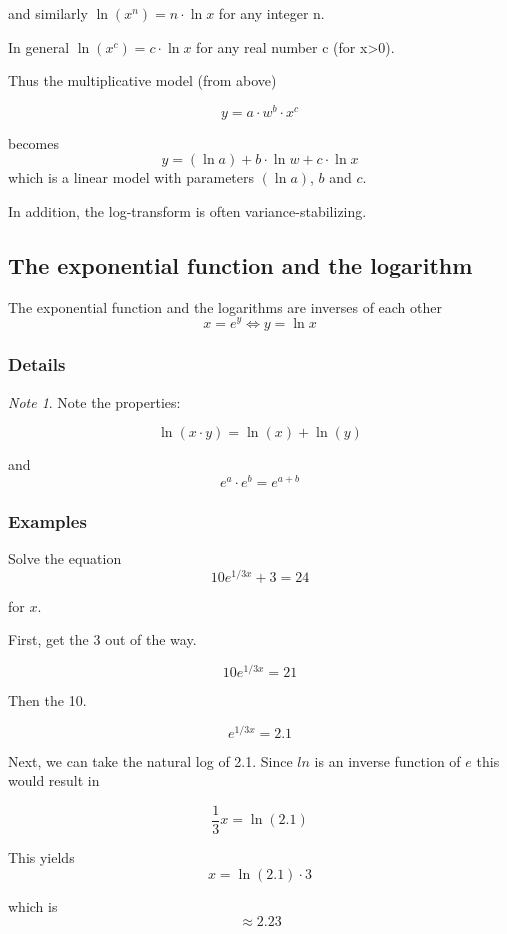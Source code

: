 \documentclass[12pt,a4paper]{article}
\theoremstyle{regla}
\theoremstyle{remark}
\newtheorem{notes}{Note}[section]
\theoremstyle{definition}
\theoremstyle{nonumberbreak}
\begin{document}
and similarly $\ln (x^n) = n \cdot \ln x$ for any integer n.

In general $\ln (x^c) = c \cdot \ln x$ for any real number c (for x>0).

Thus the multiplicative model (from above)

$$y=a \cdot w^b \cdot x^c$$

becomes
$$y= (\ln a) + b \cdot \ln w + c \cdot \ln x$$
which is a linear model with parameters $(\ln a)$, $b$ and $c$.

In addition, the log-transform is often variance-stabilizing. 

\subsection{The exponential function and the logarithm}
\begin{fbox}
\begin{minipage}{0.97\textwidth}
The exponential function and the logarithms are inverses of each other\\
$$x = e^y \Leftrightarrow y = \ln{x}$$
\end{minipage}
\end{fbox}
\subsubsection{Details}
\begin{notes}
Note the properties:

$$\ln (x \cdot y) = \ln (x) + \ln (y)$$

and
$$e^a \cdot e^b = e^{a+b}$$
\end{notes}
\subsubsection{Examples}
\begin{xmpl}

Solve the equation $$10e^{1/3x} + 3 = 24$$

for $x$.

First, get the 3 out of the way.

 $$10e^{1/3x} = 21$$

Then the 10.

$$e^{1/3x} = 2.1$$

Next, we can take the natural log of 2.1. Since $ln$ is an inverse function of $e$ this would result in 

$$\frac{1}{3}x = \ln(2.1)$$

This yields $$x = \ln(2.1) \cdot 3$$

which is $$\approx 2.23$$
\end{xmpl}
\end{document}
